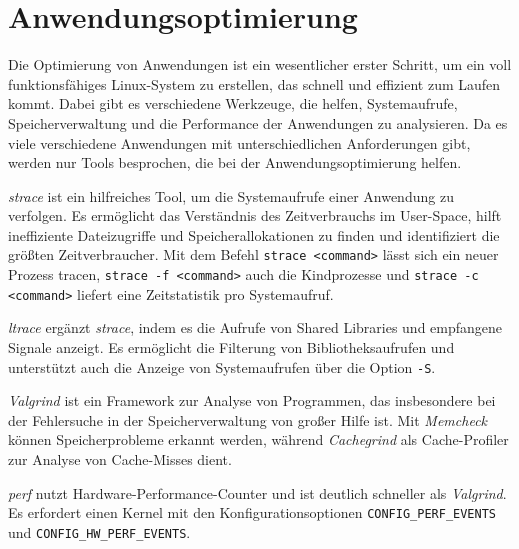 
\section{Anwendungsoptimierung}
Die Optimierung von Anwendungen ist ein wesentlicher erster Schritt, um ein voll funktionsfähiges Linux-System zu erstellen, das schnell und effizient zum Laufen kommt. Dabei gibt es verschiedene Werkzeuge, die helfen, Systemaufrufe, Speicherverwaltung und die Performance der Anwendungen zu analysieren. Da es viele verschiedene Anwendungen mit unterschiedlichen Anforderungen gibt, werden nur Tools besprochen, die bei der Anwendungsoptimierung helfen.

\textit{strace} ist ein hilfreiches Tool, um die Systemaufrufe einer Anwendung zu verfolgen. Es ermöglicht das Verständnis des Zeitverbrauchs im User-Space, hilft ineffiziente Dateizugriffe und Speicherallokationen zu finden und identifiziert die größten Zeitverbraucher. Mit dem Befehl \texttt{strace <command>} lässt sich ein neuer Prozess tracen, \texttt{strace -f <command>} auch die Kindprozesse und \texttt{strace -c <command>} liefert eine Zeitstatistik pro Systemaufruf.

\textit{ltrace} ergänzt \textit{strace}, indem es die Aufrufe von Shared Libraries und empfangene Signale anzeigt. Es ermöglicht die Filterung von Bibliotheksaufrufen und unterstützt auch die Anzeige von Systemaufrufen über die Option \texttt{-S}.

\textit{Valgrind} ist ein Framework zur Analyse von Programmen, das insbesondere bei der Fehlersuche in der Speicherverwaltung von großer Hilfe ist. Mit \textit{Memcheck} können Speicherprobleme erkannt werden, während \textit{Cachegrind} als Cache-Profiler zur Analyse von Cache-Misses dient.

\textit{perf} nutzt Hardware-Performance-Counter und ist deutlich schneller als \textit{Valgrind}. Es erfordert einen Kernel mit den Konfigurationsoptionen \texttt{CONFIG\_PERF\_EVENTS} und \texttt{CONFIG\_HW\_PERF\_EVENTS}.


